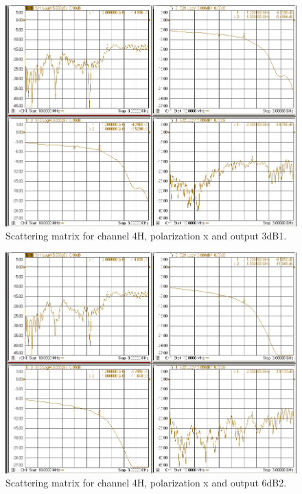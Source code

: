 \documentclass[12pt,a4paper,oneside]{article}
\begin{document}
\begin{figure}[H]
\centering
\includegraphics[width=0.9\linewidth]{VNA_results/4Hx_3dB1.png}
\caption{Scattering matrix for channel 4H, polarization x and output 3dB1.}
\label{fig:4Hx_3dB1}
\end{figure}


\begin{figure}[H]
\centering
\includegraphics[width=0.9\linewidth]{VNA_results/4Hx_6dB2.png}
\caption{Scattering matrix for channel 4H, polarization x and output 6dB2.}
\label{fig:4Hx_6dB2}
\end{figure}
\end{document}
